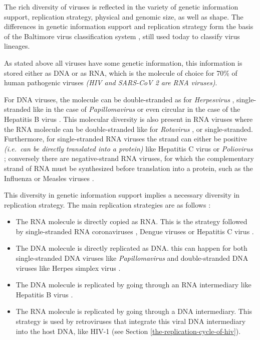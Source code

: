 \documentclass[
  11pt,
  twoside]{scrbook}
\begin{document}
The rich diversity of viruses is reflected in the variety of genetic information support, replication strategy, physical and genomic size, as well as shape. The differences in genetic information support and replication strategy form the basis of the Baltimore virus classification system \autocite{baltimoreExpressionAnimalVirus1971} , still used today \autocite{kooninBaltimoreClassificationViruses2021} to classify virus lineages.

As stated above all viruses have some genetic information, this information is stored either as DNA or as RNA, which is the molecule of choice for 70\% of human pathogenic viruses \autocite{domingoRNAVirusGenomes2018} \emph{(HIV and SARS-CoV 2 are RNA viruses)}.

For DNA viruses, the molecule can be double-stranded as for \emph{Herpesvirus} \autocite{mcgeochTopicsHerpesvirusGenomics2006,boehmerHerpesVirusReplication2003}, single-stranded like in the case of \emph{Papillomavirus} \autocite{brentjensHumanPapillomavirusReview2002} or even circular in the case of the Hepatitis B virus \autocite{kayHepatitisVirusGenetic2007}. This molecular diversity is also present in RNA viruses where the RNA molecule can be double-stranded like for \emph{Rotavirus} \autocite{parasharRotavirus1998}, or single-stranded. Furthermore, for single-stranded RNA viruses the strand can either be positive \emph{(i.e.~can be directly translated into a protein)} like Hepatitis C virus \autocite{simmondsVariabilityHepatitisVirus1995} or \emph{Poliovirus} \autocite{wimmerGeneticsPoliovirus1993,racanielloOneHundredYears2006}; conversely there are negative-strand RNA viruses, for which the complementary strand of RNA must be synthesized before translation into a protein, such as the Influenza or Measles viruses \autocite{paleseNegativestrandRNAViruses1996}.

This diversity in genetic information support implies a necessary diversity in replication strategy. The main replication strategies are as follows \autocite{domingoVirusEvolution2014}:

\begin{itemize}
\item
  The RNA molecule is directly copied as RNA. This is the strategy followed by single-stranded RNA coronaviruses \autocite{vkovskiCoronavirusBiologyReplication2021}, Dengue viruses \autocite{backDengueVirusesOverview2013} or Hepatitis C virus \autocite{dustinHepatitisVirusLife2016}.
\item
  The DNA molecule is directly replicated as DNA. this can happen for both single-stranded DNA viruses like \emph{Papillomavirus} \autocite{kadajaPapillomavirusDNAReplication2009}and double-stranded DNA viruses like Herpes simplex virus \autocite{wellerHerpesSimplexViruses2012}.
\item
  The DNA molecule is replicated by going through an RNA intermediary like Hepatitis B virus \autocite{beckHepatitisVirusReplication2007}.
\item
  The RNA molecule is replicated by going through a DNA intermediary. This strategy is used by retroviruses that integrate this viral DNA intermediary into the host DNA, like HIV-1 (see Section \ref{the-replication-cycle-of-hiv}).
\end{itemize}
\end{document}
